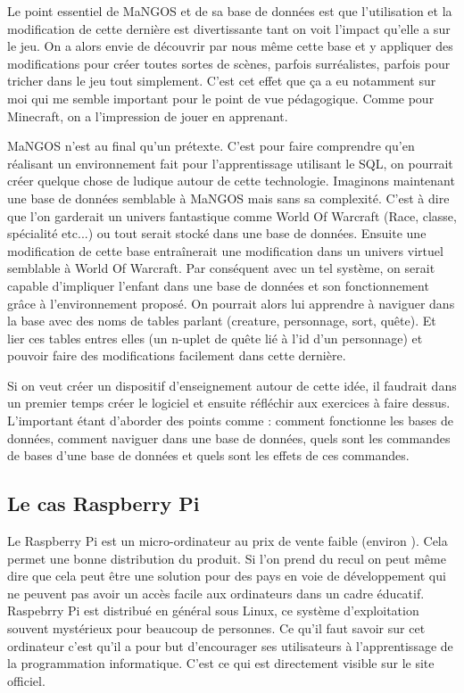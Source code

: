 Le point essentiel de MaNGOS et de sa base de données est que l'utilisation et la modification de cette dernière est divertissante tant on voit l'impact qu'elle a sur le jeu. On a alors envie de découvrir par nous même cette base et y appliquer des modifications pour créer toutes sortes de scènes, parfois surréalistes, parfois pour tricher dans le jeu tout simplement. C'est cet effet que ça a eu notamment sur moi qui me semble important pour le point de vue pédagogique. Comme pour Minecraft, on a l'impression de jouer en apprenant.

MaNGOS n'est au final qu'un prétexte. C'est pour faire comprendre qu'en réalisant un environnement fait pour l'apprentissage utilisant le SQL, on pourrait créer quelque chose de ludique autour de cette technologie. Imaginons maintenant une base de données semblable à MaNGOS mais sans sa complexité. C'est à dire que l'on garderait un univers fantastique comme World Of Warcraft (Race, classe, spécialité etc...) ou tout serait stocké dans une base de données. Ensuite une modification de cette base entraînerait une modification dans un univers virtuel semblable à World Of Warcraft. Par conséquent avec un tel système, on serait capable d'impliquer l'enfant dans une base de données et son fonctionnement grâce à l'environnement proposé. On pourrait alors lui apprendre à naviguer dans la base avec des noms de tables parlant (creature, personnage, sort, quête). Et lier ces tables entres elles (un n-uplet de quête lié à l'id d'un personnage) et pouvoir faire des modifications facilement dans cette dernière.

Si on veut créer un dispositif d'enseignement autour de cette idée, il faudrait dans un premier temps créer le logiciel et ensuite réfléchir aux exercices à faire dessus. L'important étant d'aborder des points comme : comment fonctionne les bases de données, comment naviguer dans une base de données, quels sont les commandes de bases d'une base de données et quels sont les effets de ces commandes.

\newpage

\subsection{Le cas Raspberry Pi}

Le Raspberry Pi est un micro-ordinateur au prix de vente faible (environ  ). Cela permet une bonne distribution du produit. Si l'on prend du recul on peut même dire que cela peut être une solution pour des pays en voie de développement qui ne peuvent pas avoir un accès facile aux ordinateurs dans un cadre éducatif. Raspebrry Pi est distribué en général sous Linux, ce système d'exploitation souvent mystérieux pour beaucoup de personnes. Ce qu'il faut savoir sur cet ordinateur c'est qu'il a pour but d'encourager ses utilisateurs à l'apprentissage de la programmation informatique. C'est ce qui est directement visible sur le site officiel. \cite{66}

